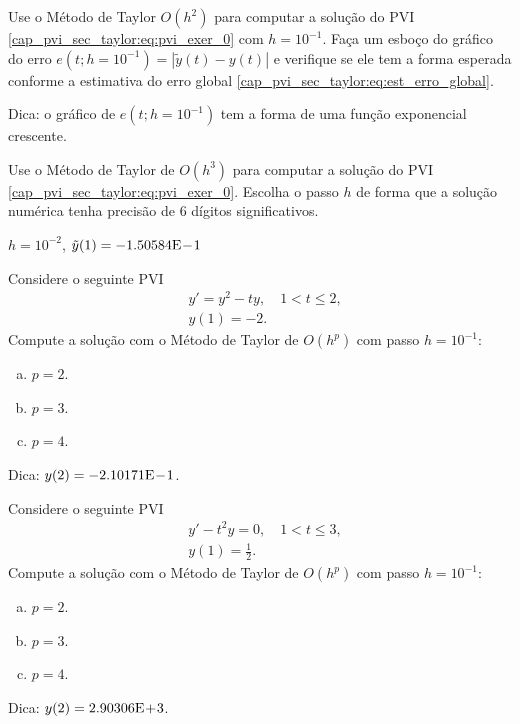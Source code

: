 \begin{exer}
  Use o Método de Taylor $O(h^2)$ para computar a solução do PVI \eqref{cap_pvi_sec_taylor:eq:pvi_exer_0} com $h=10^{-1}$. Faça um esboço do gráfico do erro $e\left(t; h=10^{-1}\right) = \left|\tilde{y}(t) - y(t)\right|$ e verifique se ele tem a forma esperada conforme a estimativa do erro global \eqref{cap_pvi_sec_taylor:eq:est_erro_global}.
\end{exer}
\begin{resp}
  Dica: o gráfico de $e\left(t; h=10^{-1}\right)$ tem a forma de uma função exponencial crescente.
\end{resp}

\begin{exer}
  Use o Método de Taylor de $O(h^3)$ para computar a solução do PVI \eqref{cap_pvi_sec_taylor:eq:pvi_exer_0}. Escolha o passo $h$ de forma que a solução numérica tenha precisão de 6 dígitos significativos.
\end{exer}
\begin{resp}
  $h=10^{-2}$, $\tilde{y}(1) = -1.50584\mathrm{E}\!-\!1$
\end{resp}

\begin{exer}
  Considere o seguinte PVI
  \begin{subequations}
    \begin{align}
      &y' = y^2 - ty,\quad 1 < t \leq 2,\\
      &y(1) = -2.
    \end{align}
  \end{subequations}
  Compute a solução com o Método de Taylor de $O\left(h^p\right)$ com passo $h = 10^{-1}$:
  \begin{enumerate}[a)]
  \item $p = 2$.
  \item $p = 3$.
  \item $p = 4$.
  \end{enumerate}
\end{exer}
\begin{resp}
  Dica: $y(2) = -2.10171\mathrm{E}\!-\!1$.
\end{resp}

\begin{exer}
  Considere o seguinte PVI
  \begin{subequations}
    \begin{align}
      &y' - t^2y = 0,\quad 1 < t \leq 3,\\
      &y(1) = \frac{1}{2}.
    \end{align}
  \end{subequations}
  Compute a solução com o Método de Taylor de $O\left(h^p\right)$ com passo $h = 10^{-1}$:
  \begin{enumerate}[a)]
  \item $p = 2$.
  \item $p = 3$.
  \item $p = 4$.
  \end{enumerate}
\end{exer}
\begin{resp}
  Dica: $y(2) = 2.90306\mathrm{E}\!+\!3$.
\end{resp}


